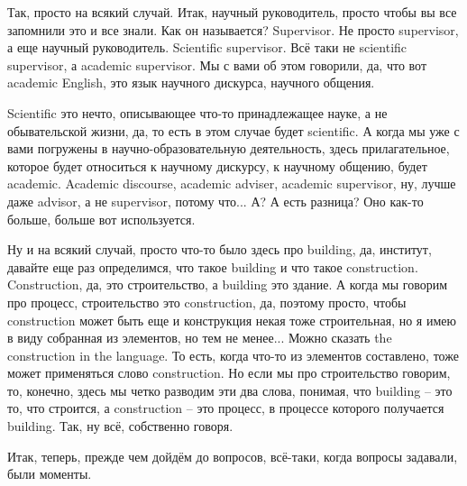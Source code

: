 \documentclass[main.tex]{subfiles}
\begin{document}
Так, просто на всякий случай.
Итак, научный руководитель, просто чтобы вы все запомнили это и все знали.
Как он называется? Supervisor.
Не просто supervisor, а еще научный руководитель.
Scientific supervisor.
Всё таки не scientific supervisor, а academic supervisor.
Мы с вами об этом говорили, да, что вот academic English, это язык научного дискурса, научного общения.

Scientific это нечто, описывающее что-то принадлежащее науке, а не обывательской жизни, да, то есть в этом случае будет scientific.
А когда мы уже с вами погружены в научно-образовательную деятельность, здесь прилагательное, которое будет относиться к научному дискурсу, к научному общению, будет academic.
Academic discourse, academic adviser, academic supervisor, ну, лучше даже advisor, а не supervisor, потому что...
А? А есть разница? Оно как-то больше, больше вот используется.

\newpage
{}

Ну и на всякий случай, просто что-то было здесь про building, да, институт, давайте еще раз определимся, что такое building и что такое construction.
Construction, да, это строительство, а building это здание.
А когда мы говорим про процесс, строительство это construction, да, поэтому просто, чтобы construction может быть еще и конструкция некая тоже строительная, но я имею в виду собранная из элементов, но тем не менее...
Можно сказать the construction in the language.
То есть, когда что-то из элементов составлено, тоже может применяться слово construction.
Но если мы про строительство говорим, то, конечно, здесь мы четко разводим эти два слова, понимая, что building -- это то, что строится, а construction -- это процесс, в процессе которого получается building.
Так, ну всё, собственно говоря.

\newpage
{}

Итак, теперь, прежде чем дойдём до вопросов, всё-таки, когда вопросы задавали, были моменты.
\end{document}
